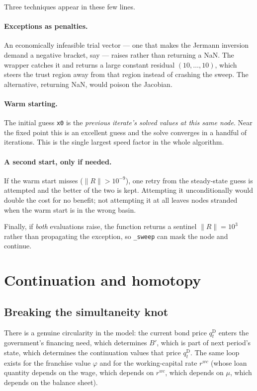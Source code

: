 \documentclass[11pt]{article}
\numberwithin{equation}{section}
\newcommand{\code}[1]{\texttt{\small #1}}
\newcommand{\D}{\mathrm{D}}
\theoremstyle{definition}
\theoremstyle{plain}
\theoremstyle{remark}
\begin{document}
Three techniques appear in these few lines.

\paragraph{Exceptions as penalties.} An economically infeasible trial vector --- one
that makes the Jermann inversion demand a negative bracket, say --- raises rather than
returning a NaN. The wrapper catches it and returns a large constant residual
$(10,\dots,10)$, which steers the trust region away from that region instead of
crashing the sweep. The alternative, returning NaN, would poison the Jacobian.

\paragraph{Warm starting.} The initial guess \code{x0} is the \emph{previous
iterate's solved values at this same node}. Near the fixed point this is an excellent
guess and the solve converges in a handful of iterations. This is the single largest
speed factor in the whole algorithm.

\paragraph{A second start, only if needed.} If the warm start misses ($\|R\|>10^{-9}$),
one retry from the steady-state guess is attempted and the better of the two is kept.
Attempting it unconditionally would double the cost for no benefit; not attempting it
at all leaves nodes stranded when the warm start is in the wrong basin.

Finally, if \emph{both} evaluations raise, the function returns a sentinel
$\|R\|=10^{3}$ rather than propagating the exception, so \code{\_sweep} can mask the
node and continue.

\section{Continuation and homotopy}
\label{sec:homotopy}

\subsection{Breaking the simultaneity knot}
\label{sec:knot}

There is a genuine circularity in the model: the current bond price $q^{\D}_t$ enters
the government's financing need, which determines $B'$, which is part of next
period's state, which determines the continuation values that price $q^{\D}_t$. The
same loop exists for the franchise value $\varphi$ and for the working-capital rate
$r^{wc}$ (whose loan quantity depends on the wage, which depends on $r^{wc}$, which
depends on $\mu$, which depends on the balance sheet).
\end{document}
